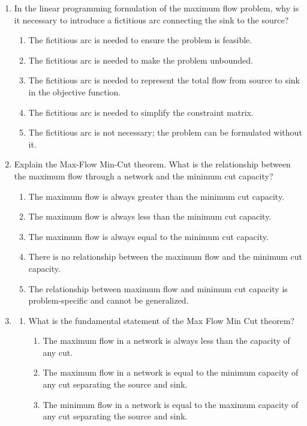\documentclass{article}%
\begin{document}
\begin{enumerate}
\item In the linear programming formulation of the maximum flow problem, why is it necessary to introduce a fictitious arc connecting the sink to the source?%
\begin{enumerate}%
\item The fictitious arc is needed to ensure the problem is feasible.%
\item The fictitious arc is needed to make the problem unbounded.%
\item The fictitious arc is needed to represent the total flow from source to sink in the objective function.%
\item The fictitious arc is needed to simplify the constraint matrix.%
\item The fictitious arc is not necessary; the problem can be formulated without it.%
\end{enumerate}%
\vspace{1em}%
\item Explain the Max-Flow Min-Cut theorem.  What is the relationship between the maximum flow through a network and the minimum cut capacity?%
\begin{enumerate}%
\item The maximum flow is always greater than the minimum cut capacity.%
\item The maximum flow is always less than the minimum cut capacity.%
\item The maximum flow is always equal to the minimum cut capacity.%
\item There is no relationship between the maximum flow and the minimum cut capacity.%
\item The relationship between maximum flow and minimum cut capacity is problem-specific and cannot be generalized.%
\end{enumerate}%
\vspace{1em}%
\item%
\begin{enumerate}%
\item What is the fundamental statement of the Max Flow Min Cut theorem?%
\begin{enumerate}%
\item The maximum flow in a network is always less than the capacity of any cut.%
\item The maximum flow in a network is equal to the minimum capacity of any cut separating the source and sink.%
\item The minimum flow in a network is equal to the maximum capacity of any cut separating the source and sink.%

\end{enumerate}
\end{enumerate}
\end{enumerate}
\end{document}

